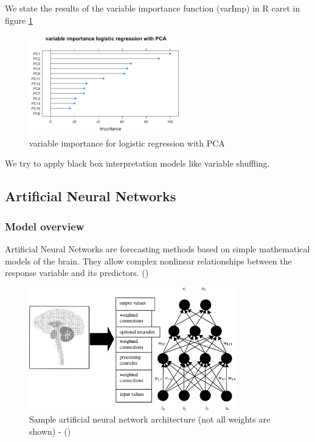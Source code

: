 \documentclass[]{article}
\begin{document}
We state the results of the variable importance function (varImp) in R
caret in figure \ref{fig:logR_var_imp}

\begin{figure}
    \centering
    \includegraphics[width=0.6\textwidth]{images/logR_varImportance.png}
    \caption{variable importance for logistic regression with PCA}
    \label{fig:logR_var_imp}
\end{figure}

We try to apply black box interpretation models like variable shuffling.

\subsection{Artificial Neural
Networks}\label{artificial-neural-networks}

\subsubsection{Model overview}\label{model-overview}

Artificial Neural Networks are forecasting methods based on simple
mathematical models of the brain. They allow complex nonlinear
relationships between the response variable and its predictors.
(\cite{otexts})

\begin{figure}
    \centering
    \includegraphics[width=0.8\textwidth]{images/ann.jpg}
    \caption{Sample artificial neural network architecture (not all weights are shown) - (\cite{ann})}
    \label{fig:ann}
\end{figure}
\end{document}

